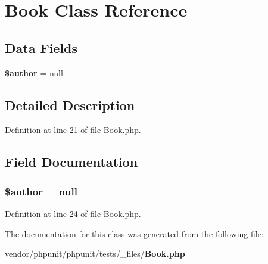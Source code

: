 \section{Book Class Reference}
\label{class_book}
\subsection*{Data Fields}
\begin{DoxyCompactItemize}
\item 
{\bf \$author} = null
\end{DoxyCompactItemize}


\subsection{Detailed Description}


Definition at line 21 of file Book.\+php.



\subsection{Field Documentation}
\subsubsection[{\$author}]{\setlength{\rightskip}{0pt plus 5cm}\$author = null}\label{class_book_ac35b828f7d4064a7c9f849c255468ee3}


Definition at line 24 of file Book.\+php.



The documentation for this class was generated from the following file\+:\begin{DoxyCompactItemize}
\item 
vendor/phpunit/phpunit/tests/\+\_\+files/{\bf Book.\+php}\end{DoxyCompactItemize}
